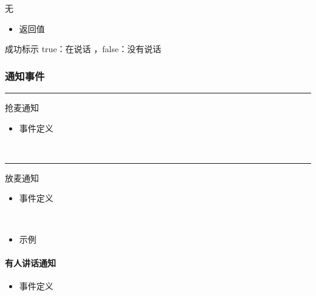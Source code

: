 \documentclass[letterpaper,10pt,english]{sphinxmanual}
\begin{document}
无
\begin{itemize}
\item {} 
返回值

\end{itemize}

成功标示 true：在说话 ，false：没有说话


\subsubsection{通知事件}
\label{\detokenize{csharp:id54}}

\bigskip\hrule\bigskip






抢麦通知
\begin{itemize}
\item {} 
事件定义

\end{itemize}

%
\begin{sphinxVerbatim}[commandchars=\\\{\}]
   
\end{sphinxVerbatim}

​


\bigskip\hrule\bigskip






放麦通知
\begin{itemize}
\item {} 
事件定义

\end{itemize}

%
\begin{sphinxVerbatim}[commandchars=\\\{\}]
   
\end{sphinxVerbatim}

​
\begin{itemize}
\item {} 
示例

\end{itemize}


\paragraph{有人讲话通知}
\label{\detokenize{csharp:id55}}\begin{itemize}
\item {} 
事件定义

\end{itemize}
\end{document}
